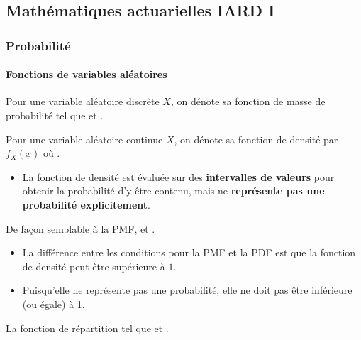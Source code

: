 \documentclass[10pt, french]{article}
\begin{document}
\begin{multicols*}{2}

\pagebreak

\part{Mathématiques actuarielles IARD I}
\label{chapt:mathIARD}
\section{Probabilité}
\subsection{Fonctions de variables aléatoires}
\begin{definitionNOHFILL}
Pour une variable aléatoire discrète $X$, on dénote sa fonction de masse de probabilité  tel que  et .
\end{definitionNOHFILL}

\begin{definitionNOHFILL}
Pour une variable aléatoire continue $X$, on dénote sa fonction de densité par $f_{X}(x)$ où . 
\begin{itemize}
	\item	La fonction de densité est évaluée sur des \textbf{intervalles de valeurs} pour obtenir la probabilité d'y être contenu, mais ne \textbf{représente pas une probabilité explicitement}.
\end{itemize}

De façon semblable à la PMF,  et .
\begin{itemize}
	\item	La différence entre les conditions pour la PMF et la PDF est que la fonction de densité peut être supérieure à $1$.
	\item	Puisqu'elle ne représente pas une probabilité, elle ne doit pas être inférieure (ou égale) à 1.
\end{itemize}
\end{definitionNOHFILL}


\begin{definitionNOHFILL}
La fonction de répartition  tel que  et .


\end{definitionNOHFILL}
\end{multicols*}
\end{document}
